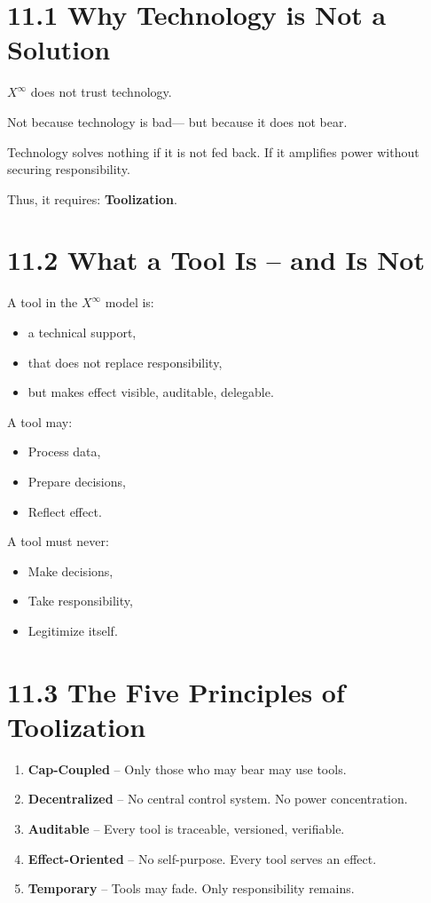 \documentclass[12pt,a4paper]{book}
\begin{document}
\section*{11.1 Why Technology is Not a Solution}

$X^\infty$ does not trust technology.

Not because technology is bad—  
but because it does not bear.

Technology solves nothing  
if it is not fed back.  
If it amplifies power without securing responsibility.

Thus, it requires: \textbf{Toolization}.

\section*{11.2 What a Tool Is – and Is Not}

A tool in the $X^\infty$ model is:

\begin{itemize}
    \item a technical support,
    \item that does not replace responsibility,
    \item but makes effect visible, auditable, delegable.
\end{itemize}

A tool may:

\begin{itemize}
    \item Process data,
    \item Prepare decisions,
    \item Reflect effect.
\end{itemize}

A tool must never:

\begin{itemize}
    \item Make decisions,
    \item Take responsibility,
    \item Legitimize itself.
\end{itemize}

\section*{11.3 The Five Principles of Toolization}

\begin{enumerate}
    \item \textbf{Cap-Coupled} – Only those who may bear may use tools.
    \item \textbf{Decentralized} – No central control system. No power concentration.
    \item \textbf{Auditable} – Every tool is traceable, versioned, verifiable.
    \item \textbf{Effect-Oriented} – No self-purpose. Every tool serves an effect.
    \item \textbf{Temporary} – Tools may fade. Only responsibility remains.
\end{enumerate}
\end{document}
